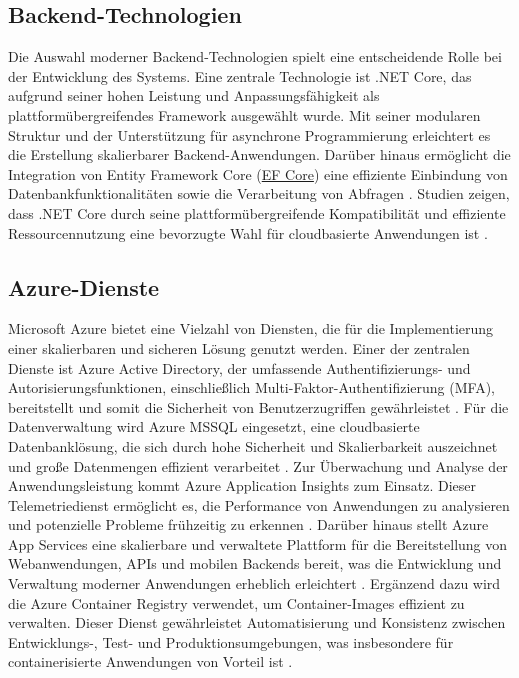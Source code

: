 \subsection*{Backend-Technologien}
Die Auswahl moderner Backend-Technologien spielt eine entscheidende Rolle bei der Entwicklung des Systems. Eine zentrale Technologie ist .NET Core, das aufgrund seiner hohen Leistung und Anpassungsfähigkeit als plattformübergreifendes Framework ausgewählt wurde. Mit seiner modularen Struktur und der Unterstützung für asynchrone Programmierung erleichtert es die Erstellung skalierbarer Backend-Anwendungen. Darüber hinaus ermöglicht die Integration von Entity Framework Core (\hyperref[abkuerzungen]{EF Core}) eine effiziente Einbindung von Datenbankfunktionalitäten sowie die Verarbeitung von Abfragen \cite{microsoftDotNet}. Studien zeigen, dass .NET Core durch seine plattformübergreifende Kompatibilität und effiziente Ressourcennutzung eine bevorzugte Wahl für cloudbasierte Anwendungen ist \cite{dotNetPerformance2021}.

\subsection*{Azure-Dienste}
Microsoft Azure bietet eine Vielzahl von Diensten, die für die Implementierung einer skalierbaren und sicheren Lösung genutzt werden. Einer der zentralen Dienste ist Azure Active Directory, der umfassende Authentifizierungs- und Autorisierungsfunktionen, einschließlich Multi-Faktor-Authentifizierung (MFA), bereitstellt und somit die Sicherheit von Benutzerzugriffen gewährleistet \cite{microsoftEntraID}. Für die Datenverwaltung wird Azure MSSQL eingesetzt, eine cloudbasierte Datenbanklösung, die sich durch hohe Sicherheit und Skalierbarkeit auszeichnet und große Datenmengen effizient verarbeitet \cite{azureDocumentation}. Zur Überwachung und Analyse der Anwendungsleistung kommt Azure Application Insights zum Einsatz. Dieser Telemetriedienst ermöglicht es, die Performance von Anwendungen zu analysieren und potenzielle Probleme frühzeitig zu erkennen \cite{microsoftAppInsights, li2021monitoring}. Darüber hinaus stellt Azure App Services eine skalierbare und verwaltete Plattform für die Bereitstellung von Webanwendungen, APIs und mobilen Backends bereit, was die Entwicklung und Verwaltung moderner Anwendungen erheblich erleichtert \cite{azureAppServices, thomas2021azure}. Ergänzend dazu wird die Azure Container Registry verwendet, um Container-Images effizient zu verwalten. Dieser Dienst gewährleistet Automatisierung und Konsistenz zwischen Entwicklungs-, Test- und Produktionsumgebungen, was insbesondere für containerisierte Anwendungen von Vorteil ist \cite{azureContainerRegistry, dockerContainers2020}.

